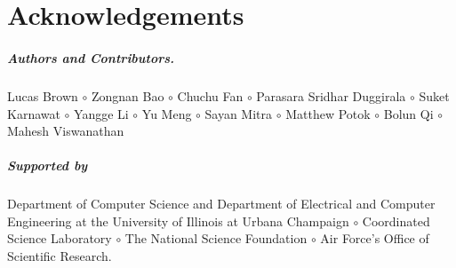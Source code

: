 \documentclass{tufte-book} %
\begin{document}

\tableofcontents %





\mainmatter

\chapter{Acknowledgements}
\label{sec:ack}

\paragraph{Authors and Contributors.}
Lucas Brown $\circ$
Zongnan Bao $\circ$
Chuchu Fan $\circ$
Parasara Sridhar Duggirala $\circ$
Suket Karnawat $\circ$
Yangge Li $\circ$
Yu Meng $\circ$
Sayan Mitra $\circ$
Matthew Potok $\circ$
Bolun Qi $\circ$
Mahesh Viswanathan 

\paragraph{Supported by}
Department of Computer Science and Department of Electrical and Computer Engineering at the University of Illinois at Urbana Champaign $\circ$
Coordinated Science Laboratory $\circ$
The National Science Foundation $\circ$ 
Air Force's Office of Scientific Research.
\end{document}

